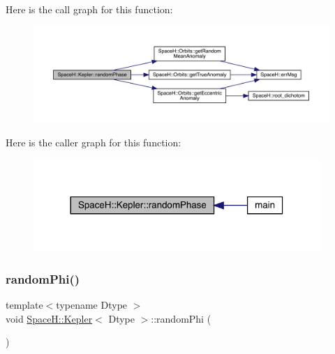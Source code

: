 Here is the call graph for this function\+:
\nopagebreak
\begin{figure}[H]
\begin{center}
\leavevmode
\includegraphics[width=350pt]{struct_space_h_1_1_kepler_a7a21a6bad2fda19e9d93e023c8879c42_cgraph}
\end{center}
\end{figure}
Here is the caller graph for this function\+:
\nopagebreak
\begin{figure}[H]
\begin{center}
\leavevmode
\includegraphics[width=308pt]{struct_space_h_1_1_kepler_a7a21a6bad2fda19e9d93e023c8879c42_icgraph}
\end{center}
\end{figure}
\mbox{\label{struct_space_h_1_1_kepler_ae8a58ee2c7658d9a1aec71ff8a8e271f}} 
\subsubsection{\texorpdfstring{random\+Phi()}{randomPhi()}}
{\footnotesize\ttfamily template$<$typename Dtype $>$ \\
void \mbox{\hyperlink{struct_space_h_1_1_kepler}{Space\+H\+::\+Kepler}}$<$ Dtype $>$\+::random\+Phi (\begin{DoxyParamCaption}{ }\end{DoxyParamCaption})\hspace{0.3cm}{\ttfamily [inline]}}

\mbox{\label{struct_space_h_1_1_kepler_a162d47c07b7dbcd361dae5725b718760}} 
